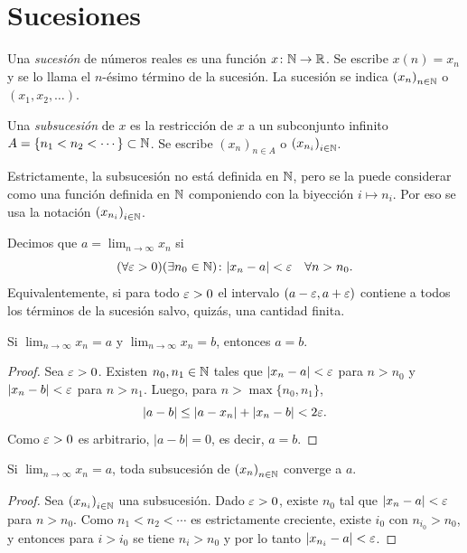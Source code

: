 \section{Sucesiones}

Una \emph{sucesión} de números reales es una función \(x\colon \mathbb{N} \to \mathbb{R}\). Se escribe \(x(n) = x_n\) y se lo llama el \(n\)-ésimo término de la sucesión. La sucesión se indica \({(x_n)}_{n \in \mathbb{N}}\) o \((x_1, x_2, \dots)\).

Una \emph{subsucesión} de \(x\) es la restricción de \(x\) a un subconjunto infinito \(A = \{ n_1 < n_2 < \cdots \} \subset \mathbb{N}\). Se escribe \({(x_n)}_{n \in A}\) o \({(x_{n_i})}_{i \in \mathbb{N}}\).

\begin{note}
  Estrictamente, la subsucesión no está definida en \(\mathbb{N}\), pero se la puede considerar como una función definida en \(\mathbb{N}\) componiendo con la biyección \(i \mapsto n_i\). Por eso se usa la notación \({(x_{n_i})}_{i \in \mathbb{N}}\).
\end{note}

\begin{definition}[Límite]
  Decimos que \(a = \lim_{n \to \infty} x_n\) si
  \[
    (\forall \varepsilon > 0)(\exists n_0 \in \mathbb{N}) \colon |x_n - a| < \varepsilon \quad \forall n > n_0.
  \]
  Equivalentemente, si para todo \(\varepsilon > 0\) el intervalo \((a - \varepsilon, a + \varepsilon)\) contiene a todos los términos de la sucesión salvo, quizás, una cantidad finita.
\end{definition}

\begin{theorem}
  Si \(\lim_{n \to \infty} x_n = a\) y \(\lim_{n \to \infty} x_n = b\), entonces \(a = b\).
\end{theorem}

\begin{proof}
  Sea \(\varepsilon > 0\). Existen \(n_0, n_1 \in \mathbb{N}\) tales que \(|x_n - a| < \varepsilon\) para \(n > n_0\) y \(|x_n - b| < \varepsilon\) para \(n > n_1\). Luego, para \(n > \max\{n_0, n_1\}\),
  \[
    |a - b| \leq |a - x_n| + |x_n - b| < 2\varepsilon.
  \]
  Como \(\varepsilon > 0\) es arbitrario, \(|a - b| = 0\), es decir, \(a = b\).
\end{proof}

\begin{theorem}
  Si \(\lim_{n \to \infty} x_n = a\), toda subsucesión de \({(x_n)}_{n \in \mathbb{N}}\) converge a \(a\).
\end{theorem}

\begin{proof}
  Sea \({(x_{n_i})}_{i \in \mathbb{N}}\) una subsucesión. Dado \(\varepsilon > 0\), existe \(n_0\) tal que \(|x_n - a| < \varepsilon\) para \(n > n_0\). Como \(n_1 < n_2 < \cdots\) es estrictamente creciente, existe \(i_0\) con \(n_{i_0} > n_0\), y entonces para \(i > i_0\) se tiene \(n_i > n_0\) y por lo tanto \(|x_{n_i} - a| < \varepsilon\).
\end{proof}


